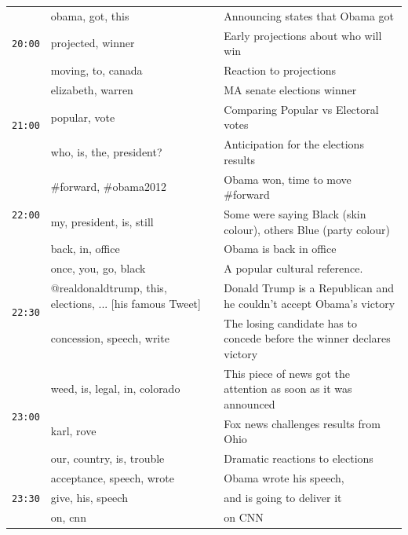 \documentclass{sig-alternate}
\begin{document}
\begin{table}
\begin{center}
\begin{tabular}{|p{.6cm}|p{2.5cm}|p{5cm}|}
\multirow{3}{*}{\texttt{20:00}} 	& obama, got, this		&  Announcing states that Obama got \\ \cline{2-3}
					   	& projected, winner		& Early projections about who will win \\ \cline{2-3}
						& moving, to, canada		&  Reaction to projections \\\hline


\multirow{3}{*}{\texttt{21:00}} 	& elizabeth, warren		&  MA senate elections winner \\ \cline{2-3}
					   	& popular, vote		& Comparing Popular vs Electoral votes \\ \cline{2-3}
						& who, is, the, president?		&  Anticipation for the elections results\\\hline
						

\multirow{3}{*}{\texttt{22:00}} 	& \#forward, \#obama2012		&  Obama won, time to move \#forward \\ \cline{2-3}
					   	& my, president, is, still		& Some were saying Black (skin colour), others Blue (party colour) \\ \cline{2-3}
						& back, in, office		&   Obama is back in office\\\hline

\multirow{3}{*}{\texttt{22:30}} 	& once, you, go, black		& A popular cultural reference.\\ \cline{2-3} %
					   	& @realdonaldtrump, this, elections, ... [his famous Tweet] 		& Donald Trump is a Republican and he couldn't accept Obama's victory\\ \cline{2-3}
						& concession, speech, write		&   The losing candidate has to concede before the winner declares victory \\\hline
						
\multirow{3}{*}{\texttt{23:00}} 	& weed, is, legal, in, colorado		&  This piece of news got the attention as soon as it was announced  \\ \cline{2-3}
					   	& karl, rove		& Fox news challenges results from Ohio\\ \cline{2-3}
						& our, country, is, trouble		&   Dramatic reactions to elections \\\hline						
\multirow{3}{*}{\texttt{23:30}} 	& acceptance, speech, wrote		&  Obama wrote his speech, \\ \cline{2-3}
					   	& give, his, speech		& and is going to deliver it \\ \cline{2-3}
						& on, cnn		&   on CNN \\\hline	
						

\end{tabular}
\end{center}
\end{table}
\end{document}

